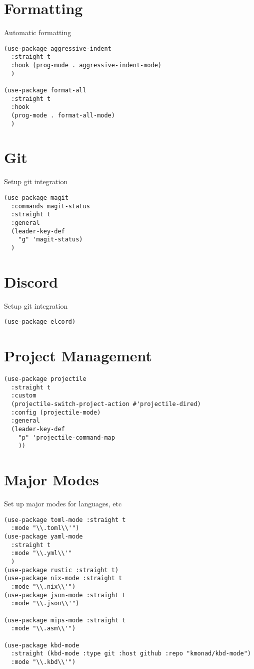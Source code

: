 \documentclass[11pt]{article}
\begin{document}
\section{Formatting}
\label{sec:org7e60e49}
Automatic formatting
\begin{verbatim}
(use-package aggressive-indent
  :straight t
  :hook (prog-mode . aggressive-indent-mode)
  )

(use-package format-all
  :straight t
  :hook
  (prog-mode . format-all-mode)
  )
\end{verbatim}

\section{Git}
\label{sec:orga9cc6bb}
Setup git integration
\begin{verbatim}
(use-package magit
  :commands magit-status
  :straight t
  :general
  (leader-key-def
    "g" 'magit-status)
  )
\end{verbatim}

\section{Discord}
\label{sec:org37eff7b}
Setup git integration
\begin{verbatim}
(use-package elcord)
\end{verbatim}
\section{Project Management}
\label{sec:org252cca2}
\begin{verbatim}
(use-package projectile
  :straight t
  :custom
  (projectile-switch-project-action #'projectile-dired)
  :config (projectile-mode)
  :general
  (leader-key-def
    "p" 'projectile-command-map
    ))
\end{verbatim}

\section{Major Modes}
\label{sec:org390975f}
Set up major modes for languages, etc
\begin{verbatim}
(use-package toml-mode :straight t
  :mode "\\.toml\\'")
(use-package yaml-mode
  :straight t
  :mode "\\.yml\\'"
  )
(use-package rustic :straight t)
(use-package nix-mode :straight t
  :mode "\\.nix\\'")
(use-package json-mode :straight t
  :mode "\\.json\\'")

(use-package mips-mode :straight t
  :mode "\\.asm\\'")

(use-package kbd-mode
  :straight (kbd-mode :type git :host github :repo "kmonad/kbd-mode")
  :mode "\\.kbd\\'")
\end{verbatim}
\end{document}
